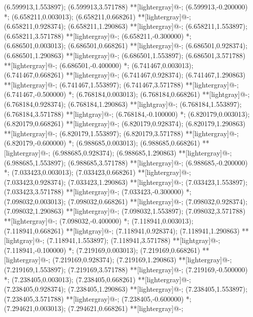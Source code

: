 (6.599913,1.553897); (6.599913,3.571788) **[lightergray]@{-};
(6.599913,-0.200000) *{};
(6.658211,0.003013); (6.658211,0.668261) **[lightergray]@{-};
(6.658211,0.928374); (6.658211,1.290863) **[lightergray]@{-};
(6.658211,1.553897); (6.658211,3.571788) **[lightergray]@{-};
(6.658211,-0.300000) *{};
(6.686501,0.003013); (6.686501,0.668261) **[lightergray]@{-};
(6.686501,0.928374); (6.686501,1.290863) **[lightergray]@{-};
(6.686501,1.553897); (6.686501,3.571788) **[lightergray]@{-};
(6.686501,-0.400000) *{};
(6.741467,0.003013); (6.741467,0.668261) **[lightergray]@{-};
(6.741467,0.928374); (6.741467,1.290863) **[lightergray]@{-};
(6.741467,1.553897); (6.741467,3.571788) **[lightergray]@{-};
(6.741467,-0.500000) *{};
(6.768184,0.003013); (6.768184,0.668261) **[lightgray]@{-};
(6.768184,0.928374); (6.768184,1.290863) **[lightgray]@{-};
(6.768184,1.553897); (6.768184,3.571788) **[lightgray]@{-};
(6.768184,-0.100000) *{};
(6.820179,0.003013); (6.820179,0.668261) **[lightergray]@{-};
(6.820179,0.928374); (6.820179,1.290863) **[lightergray]@{-};
(6.820179,1.553897); (6.820179,3.571788) **[lightergray]@{-};
(6.820179,-0.600000) *{};
(6.988685,0.003013); (6.988685,0.668261) **[lightergray]@{-};
(6.988685,0.928374); (6.988685,1.290863) **[lightergray]@{-};
(6.988685,1.553897); (6.988685,3.571788) **[lightergray]@{-};
(6.988685,-0.200000) *{};
(7.033423,0.003013); (7.033423,0.668261) **[lightergray]@{-};
(7.033423,0.928374); (7.033423,1.290863) **[lightergray]@{-};
(7.033423,1.553897); (7.033423,3.571788) **[lightergray]@{-};
(7.033423,-0.300000) *{};
(7.098032,0.003013); (7.098032,0.668261) **[lightergray]@{-};
(7.098032,0.928374); (7.098032,1.290863) **[lightergray]@{-};
(7.098032,1.553897); (7.098032,3.571788) **[lightergray]@{-};
(7.098032,-0.400000) *{};
(7.118941,0.003013); (7.118941,0.668261) **[lightgray]@{-};
(7.118941,0.928374); (7.118941,1.290863) **[lightgray]@{-};
(7.118941,1.553897); (7.118941,3.571788) **[lightgray]@{-};
(7.118941,-0.100000) *{};
(7.219169,0.003013); (7.219169,0.668261) **[lightergray]@{-};
(7.219169,0.928374); (7.219169,1.290863) **[lightergray]@{-};
(7.219169,1.553897); (7.219169,3.571788) **[lightergray]@{-};
(7.219169,-0.500000) *{};
(7.238405,0.003013); (7.238405,0.668261) **[lightergray]@{-};
(7.238405,0.928374); (7.238405,1.290863) **[lightergray]@{-};
(7.238405,1.553897); (7.238405,3.571788) **[lightergray]@{-};
(7.238405,-0.600000) *{};
(7.294621,0.003013); (7.294621,0.668261) **[lightergray]@{-};
